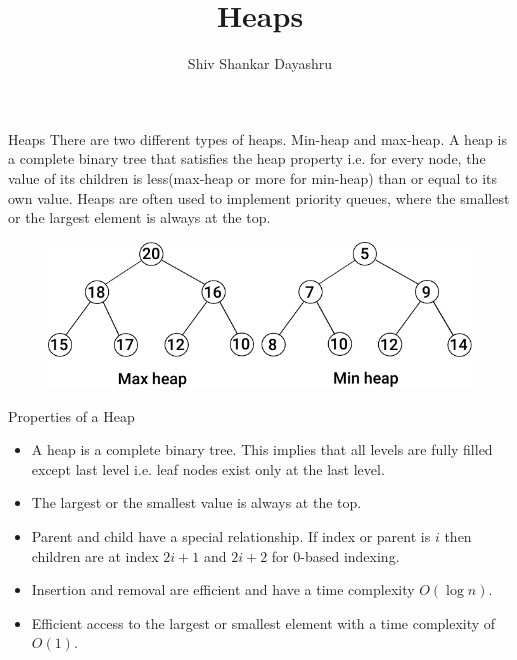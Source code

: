 \documentclass[aspectratio=169,8pt]{beamer}
\title{Heaps}
\author[Shiv Shankar Dayashru]{Shiv Shankar Dayashru}
\begin{document}
\begin{frame}
  \titlepage
\end{frame}
\begin{frame}{Heaps}
  There are two different types of heaps. Min-heap and max-heap. A heap is a complete binary tree that
  satisfies the heap property i.e. for every node, the value of its children is less(max-heap or more for
  min-heap) than or equal to its own value. Heaps are often used to implement priority queues, where the
  smallest or the largest element is always at the top.
  \begin{center}
    \begin{figure}
      \includegraphics{heap1}
    \end{figure}
  \end{center}
\end{frame}
\begin{frame}{Properties of a Heap}
  \begin{itemize}
  \item A heap is a complete binary tree. This implies that all levels are fully filled except last level
    i.e. leaf nodes exist only at the last level.
  \item The largest or the smallest value is always at the top.
  \item Parent and child have a special relationship. If index or parent is $i$ then children are at index
    $2i + 1$ and $2i + 2$ for $0$-based indexing.
  \item Insertion and removal are efficient and have a time complexity $O(\log n)$.
  \item Efficient access to the largest or smallest element with a time complexity of $O(1)$.
  \end{itemize}
\end{frame}
\end{document}
